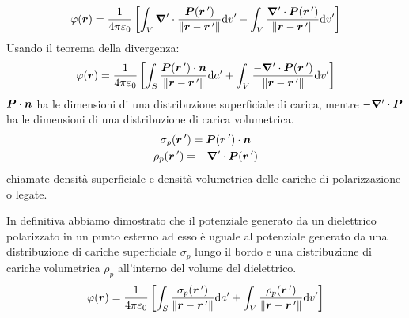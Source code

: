 \begin{equation}
  \varphi(\boldsymbol{r})=\frac{1}{4\pi\varepsilon_0}\left[\int_V\boldsymbol{\nabla}'\cdot\frac{\boldsymbol{P}(\boldsymbol{r}\,')}{\left\lVert\boldsymbol{r}-\boldsymbol{r}\,'\right\rVert}\mathrm{d} v'-\int_V\frac{\boldsymbol{\nabla}'\cdot\boldsymbol{P}(\boldsymbol{r}\,')}{\left\lVert\boldsymbol{r}-\boldsymbol{r}\,'\right\rVert}\mathrm{d} v'\right]
\end{equation}
Usando il teorema della divergenza:
\begin{equation}
  \varphi(\boldsymbol{r})=\frac{1}{4\pi\varepsilon_0}\left[\int_S\frac{\boldsymbol{P}(\boldsymbol{r}\,')\cdot \boldsymbol{n}}{\left\lVert\boldsymbol{r}-\boldsymbol{r}\,'\right\rVert}\mathrm{d} a'+\int_V\frac{-\boldsymbol{\nabla}'\cdot\boldsymbol{P}(\boldsymbol{r}\,')}{\left\lVert\boldsymbol{r}-\boldsymbol{r}\,'\right\rVert}\mathrm{d} v'\right]
\end{equation}
$\boldsymbol{P}\cdot\boldsymbol{n}$ ha le dimensioni di una distribuzione superficiale di carica, mentre $-\boldsymbol{\nabla}'\cdot\boldsymbol{P}$ ha le dimensioni di una distribuzione di carica volumetrica.
\begin{subequations}
  \begin{gather}
    \sigma_p(\boldsymbol{r}\,')=\boldsymbol{P}(\boldsymbol{r}\,')\cdot \boldsymbol{n}\\
    \rho_p(\boldsymbol{r}\,')=-\boldsymbol{\nabla}'\cdot\boldsymbol{P}(\boldsymbol{r}\,')
  \end{gather}
\end{subequations}
chiamate densità superficiale e densità volumetrica delle cariche di polarizzazione o legate.

In definitiva abbiamo dimostrato che il potenziale generato da un dielettrico polarizzato in un punto esterno ad esso è uguale al potenziale generato da una distribuzione di cariche superficiale $\sigma_p$ lungo il bordo e una distribuzione di cariche volumetrica $\rho_p$ all'interno del volume del dielettrico.
\begin{equation}
  \varphi(\boldsymbol{r})=\frac{1}{4\pi\varepsilon_0}\left[\int_S\frac{\sigma_p(\boldsymbol{r}\,')}{\left\lVert\boldsymbol{r}-\boldsymbol{r}\,'\right\rVert}\mathrm{d} a'+\int_V\frac{\rho_p(\boldsymbol{r}\,')}{\left\lVert\boldsymbol{r}-\boldsymbol{r}\,'\right\rVert}\mathrm{d} v'\right]
  \label{potenziale_dielettrico_esterno9}
\end{equation}


